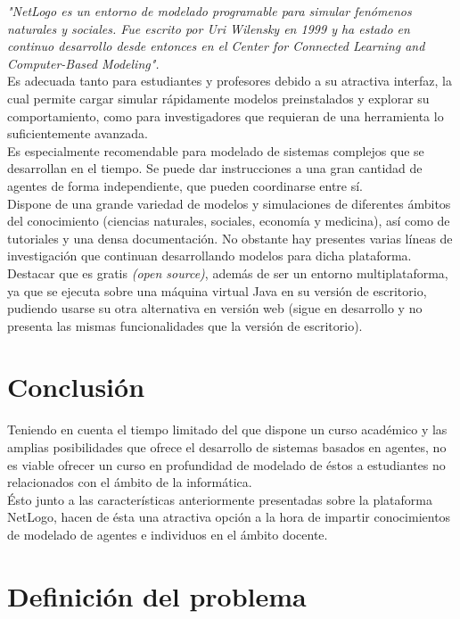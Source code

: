 \documentclass[a4paper,12pt]{report}
\begin{document}
\textit{"NetLogo es un entorno de modelado programable para simular fenómenos naturales y sociales. Fue escrito por Uri Wilensky en 1999 y ha estado en continuo desarrollo desde entonces en el Center for Connected Learning and Computer-Based Modeling".}
\vspace{8mm}\\
Es adecuada tanto para estudiantes y profesores debido a su atractiva interfaz, la cual permite cargar simular rápidamente modelos preinstalados y explorar su comportamiento, como para investigadores que requieran de una herramienta lo suficientemente avanzada.
\vspace{2mm}\\
Es especialmente recomendable para modelado de sistemas complejos que se desarrollan en el tiempo. Se puede dar instrucciones a una gran cantidad de agentes de forma independiente, que pueden coordinarse entre sí.
\vspace{6mm}\\
Dispone de una grande variedad de modelos y simulaciones de diferentes ámbitos del conocimiento (ciencias naturales, sociales, economía y medicina), así como de tutoriales y una densa documentación. No obstante hay presentes varias líneas de investigación que continuan desarrollando modelos para dicha plataforma.
\vspace{2mm}\\
Destacar que es gratis \textit{(open source)}, además de ser un entorno multiplataforma, ya que se ejecuta sobre una máquina virtual Java en su versión de escritorio, pudiendo usarse su otra alternativa en versión web (sigue en desarrollo y no presenta las mismas funcionalidades que la versión de escritorio). 


\section{Conclusión}

Teniendo en cuenta el tiempo limitado del que dispone un curso
académico y las amplias posibilidades que ofrece el desarrollo de sistemas basados en agentes, no es viable ofrecer un curso en profundidad de modelado de éstos a estudiantes no relacionados con el ámbito de la informática.
\vspace{2mm}\\
Ésto junto a las características anteriormente presentadas sobre la plataforma NetLogo, hacen de ésta una atractiva opción a la hora de impartir conocimientos de modelado de agentes e individuos en el ámbito docente. 


\section{Definición del problema}
\end{document}
